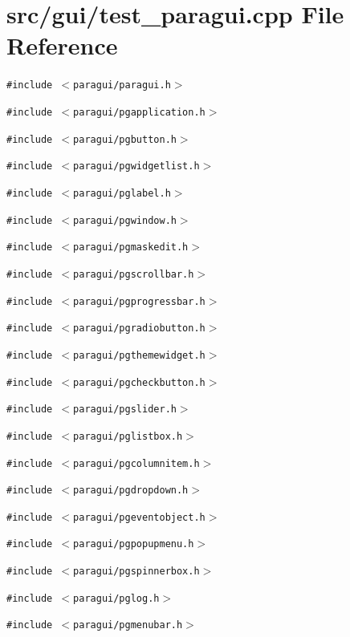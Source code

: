 \section{src/gui/test\_\-paragui.cpp File Reference}
\label{test__paragui_8cpp}
{\tt \#include $<$paragui/paragui.h$>$}\par
{\tt \#include $<$paragui/pgapplication.h$>$}\par
{\tt \#include $<$paragui/pgbutton.h$>$}\par
{\tt \#include $<$paragui/pgwidgetlist.h$>$}\par
{\tt \#include $<$paragui/pglabel.h$>$}\par
{\tt \#include $<$paragui/pgwindow.h$>$}\par
{\tt \#include $<$paragui/pgmaskedit.h$>$}\par
{\tt \#include $<$paragui/pgscrollbar.h$>$}\par
{\tt \#include $<$paragui/pgprogressbar.h$>$}\par
{\tt \#include $<$paragui/pgradiobutton.h$>$}\par
{\tt \#include $<$paragui/pgthemewidget.h$>$}\par
{\tt \#include $<$paragui/pgcheckbutton.h$>$}\par
{\tt \#include $<$paragui/pgslider.h$>$}\par
{\tt \#include $<$paragui/pglistbox.h$>$}\par
{\tt \#include $<$paragui/pgcolumnitem.h$>$}\par
{\tt \#include $<$paragui/pgdropdown.h$>$}\par
{\tt \#include $<$paragui/pgeventobject.h$>$}\par
{\tt \#include $<$paragui/pgpopupmenu.h$>$}\par
{\tt \#include $<$paragui/pgspinnerbox.h$>$}\par
{\tt \#include $<$paragui/pglog.h$>$}\par
{\tt \#include $<$paragui/pgmenubar.h$>$}\par


